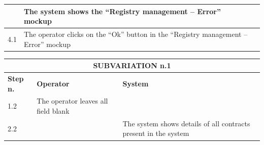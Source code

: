 {{{\begin{table}[h]
\begin{tabular}{|p{2cm}|p{6cm}|p{6cm}|}
				\vspace{1mm} \vspace{1mm} & 
				\vspace{1mm} The system shows the “Registry management – Error” mockup \vspace{1mm} \\
			\hline
				\vspace{1mm} 4.1 \vspace{1mm} &
				\vspace{1mm} The operator clicks on the “Ok” button in the “Registry management – Error” mockup \vspace{1mm} & 
				\vspace{1mm} \vspace{1mm} \\
			\hline
			\end{tabular}
			\end{table}
			\begin{table}[h]
			\begin{tabular}{|p{2cm}|p{6cm}|p{6cm}|}
			\hline
				\multicolumn{3}{|c|}{SUBVARIATION n.1} \\
			\hline
				\centering \vspace{1mm} \bfseries{Step n.} \vspace{1mm} & \vspace{1mm} \bfseries{Operator} \vspace{1mm} & \vspace{1mm} \bfseries{System} \vspace{1mm}\\
			\hline
				\vspace{1mm} 1.2 \vspace{1mm} &
				\vspace{1mm} The operator leaves all field blank \vspace{1mm} & 
				\vspace{1mm} \vspace{1mm} \\
			\hline
				\vspace{1mm} 2.2 \vspace{1mm} &
				\vspace{1mm} \vspace{1mm} & 
				\vspace{1mm} The system shows details of all contracts present in the system \vspace{1mm} \\
			\hline
			\end{tabular}
			\end{table}

}}}
